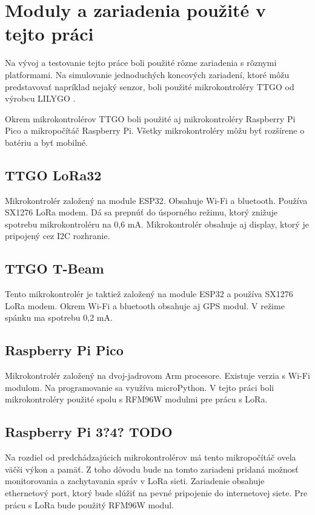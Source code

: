 \documentclass[slovak,master]{diploma}
\begin{document}
\section{Moduly a zariadenia použité v tejto práci}
Na vývoj a testovanie tejto práce boli použité rôzne zariadenia s rôznymi platformami. Na simulovanie jednoduchých koncových zariadení, 
ktoré môžu predstavovať napríklad nejaký senzor, boli použité mikrokontroléry TTGO od výrobcu LILYGO \cite{lilygo}.

Okrem mikrokontrolérov TTGO boli použité aj mikrokontroléry Raspberry Pi Pico a mikropočítáč Raspberry Pi.
Všetky mikrokontroléry môžu byť rozšírene o batériu a byť mobilné.

\subsection{TTGO LoRa32}
Mikrokontrolér založený na module ESP32. Obsahuje Wi-Fi a bluetooth. Používa SX1276 LoRa modem.
Dá sa prepnúť do úsporného režimu, ktorý znižuje spotrebu mikrokontroléru na 0,6 mA.
Mikrokontrolér obsahuje aj display, ktorý je pripojený cez I2C rozhranie.

\subsection{TTGO T-Beam}
Tento mikrokontrolér je taktiež založený na module ESP32 a používa SX1276 LoRa modem. Okrem Wi-Fi a bluetooth obsahuje aj GPS modul.
V režime spánku ma spotrebu 0,2 mA.

\subsection{Raspberry Pi Pico}
Mikrokontrolér založený na dvoj-jadrovom Arm procesore. Existuje verzia s Wi-Fi modulom. Na programovanie sa využíva microPython. %
V tejto práci boli mikrokontroléry použité spolu s RFM96W modulmi pre prácu s LoRa.

\subsection{Raspberry Pi 3?4? TODO}
Na rozdiel od predchádzajúcich mikrokontrolérov má tento mikropočítáč ovela väčši výkon a pamäť. Z toho dôvodu bude na tomto zariadeni pridaná 
možnosť monitorovania a zachytavania správ v LoRa sieti. Zariadenie obsahuje ethernetový port, ktorý bude slúžiť na pevné pripojenie do internetovej siete.
Pre prácu s LoRa bude použitý RFM96W modul.
\end{document}
